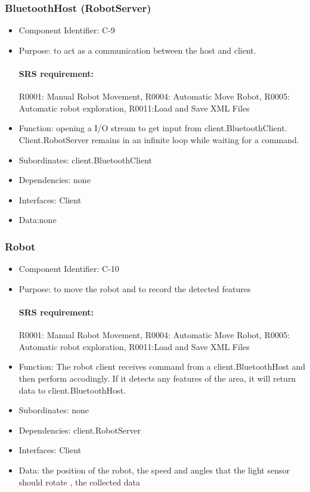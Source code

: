 \documentclass[11pt, a4paper]{report}
\begin{document}
\subsubsection{BluetoothHost (RobotServer)}
\begin{itemize}
\item Component Identifier: C-9
\item Purpose: to act as a communication between the host and client.
\paragraph{SRS requirement:} R0001: Manual Robot Movement, R0004: Automatic Move Robot,
R0005: Automatic robot exploration, R0011:Load and Save XML Files
\item Function: opening a I/O stream to get input from client.BluetoothClient.
Client.RobotServer remains in an infinite loop while waiting for a command.
\item Subordinates: client.BluetoothClient 
\item Dependencies: none
\item Interfaces: Client
\item Data:none
\end{itemize}



\subsubsection{Robot}
\begin{itemize}
\item Component Identifier: C-10
\item Purpose: to move the robot and to record the detected features
\paragraph{SRS requirement:}R0001: Manual Robot Movement, R0004: Automatic Move Robot,
R0005: Automatic robot exploration, R0011:Load and Save XML Files
\item Function: The robot client receives command from a client.BluetoothHost and then perform
accodingly. If it detects any features of the area, it will return data to client.BluetoothHost.
\item Subordinates: none
\item Dependencies: client.RobotServer
\item Interfaces:  Client
\item Data: the position of the robot, the speed and angles that the light sensor should rotate
, the collected data
\end{itemize}
\end{document}
